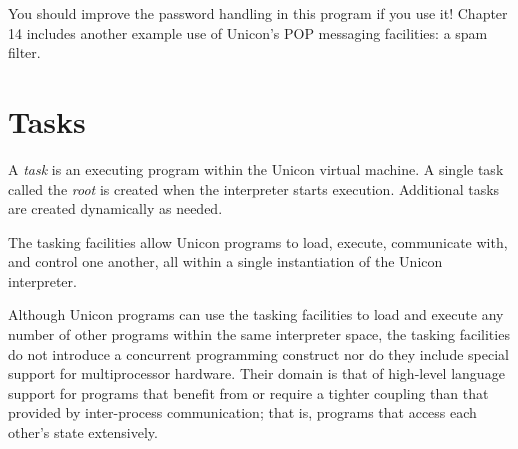 
\noindent
You should improve the password handling in this program if you use it!
Chapter 14 includes another example use of
Unicon's POP messaging facilities: a spam filter.

\section{Tasks}

A {\em task\/} is an executing program within the Unicon virtual
machine. A single task called the {\em root\/} is created
when the interpreter starts execution. Additional tasks are created
dynamically as needed.

The tasking facilities allow Unicon programs to load, execute,
communicate with, and control one another, all within a single
instantiation of the Unicon interpreter. 

Although Unicon programs can use the tasking facilities to load and
execute any number of other programs within the same interpreter space,
the tasking facilities do not introduce a concurrent programming
construct nor do they include special support for multiprocessor
hardware. Their domain is that of high-level language support for
programs that benefit from or require a tighter coupling than that
provided by inter-process communication; that is, programs that access
each other's state extensively.

